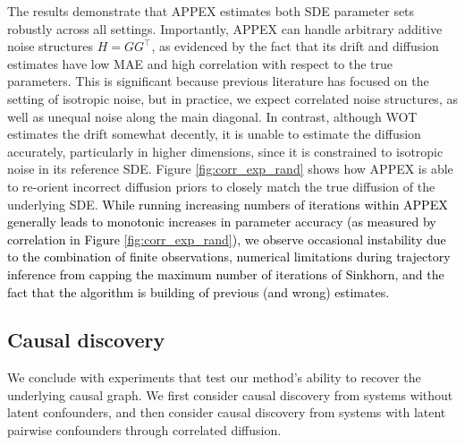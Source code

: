 \documentclass[twoside,11pt]{article}
\newcommand{\rv}[1]{\textcolor{black}{#1}}
\begin{document}
The results demonstrate that APPEX estimates both SDE parameter sets robustly across all settings. Importantly, APPEX can handle arbitrary additive noise structures $H=GG^\top$, as evidenced by the fact that its drift and diffusion estimates have low MAE and high correlation with respect to the true parameters. This is significant because previous literature has focused on the setting of isotropic noise, but in practice, we expect correlated noise structures, as well as unequal noise along the main diagonal. In contrast, although WOT estimates the drift somewhat decently, it is unable to estimate the diffusion accurately, particularly in higher dimensions, since it is constrained to isotropic noise in its reference SDE. Figure \ref{fig:corr_exp_rand} shows how APPEX is able to re-orient incorrect diffusion priors to closely match the true diffusion of the underlying SDE. \rv{While running increasing numbers of iterations within APPEX generally leads to monotonic increases in parameter accuracy (as measured by correlation in Figure \ref{fig:corr_exp_rand}), we observe occasional instability due to the combination of finite observations, numerical limitations during trajectory inference from capping the maximum number of iterations of Sinkhorn, and the fact that the algorithm is building of previous (and wrong) estimates.}


\subsection{Causal discovery}
\label{sec: causal_discovery}

We conclude with experiments that test our method's ability to recover the underlying causal graph. We first consider causal discovery from systems without latent confounders, and then consider causal discovery from systems with latent pairwise confounders through correlated diffusion. 
\end{document}
